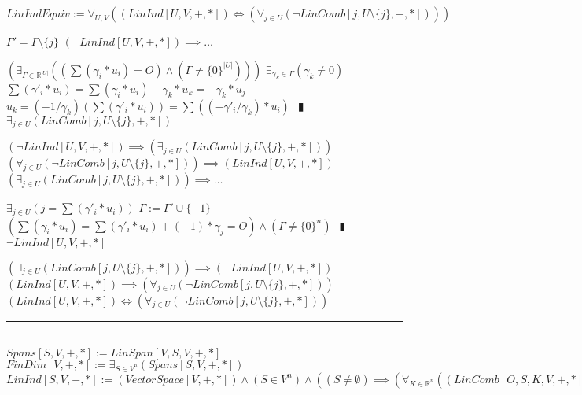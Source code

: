 \documentclass{book}
\newcommand{\abr}{:=}
\newcommand{\pipe}{$\phantom{(}\vrectangleblack\phantom{)}$}
\newcommand{\pr}[1]{\left(#1\right)}
\begin{document}
$LinIndEquiv \abr \forall_{U, V}\pr{(LinInd[U, V, +, *]) \iff \pr{\forall_{j \in U}(\lnot LinComb[j, U \setminus \{j\}, +, *])}}$
\begin{enumerate}
  \lit $\Gamma' = \Gamma \setminus \{j\}$
  \lit $(\lnot LinInd[U, V, +, *]) \implies \ldots$
  \begin{enumerate}
    \lit $\pr{\exists_{\Gamma \in \mathbb{R}^|U|}\pr{\pr{\sum(\gamma_i * u_i) = O} \land (\Gamma \neq \{0\}^{|U|})}}$
    \lit $\exists_{\gamma_k \in \Gamma}(\gamma_k \neq 0)$
    \lit $\sum(\gamma'_i * u_i) = \sum(\gamma_i * u_i) - \gamma_k * u_k = -\gamma_k * u_j$
    \lit $u_k = (-1 / \gamma_k)\pr{\sum(\gamma'_i * u_i)} = \sum\pr{ (-\gamma'_i / \gamma_k) * u_i}$ \pipe $\exists_{j \in U}(LinComb[j, U \setminus \{j\}, +, *])$
   \end{enumerate}
  \lit $(\lnot LinInd[U, V, +, *]) \implies \pr{\exists_{j \in U}(LinComb[j, U \setminus \{j\}, +, *])}$
  \lit $\pr{\forall_{j \in U}(\lnot LinComb[j, U \setminus \{j\}, +, *])} \implies (LinInd[U, V, +, *])$
  \lit $\pr{\exists_{j \in U}(LinComb[j, U \setminus \{j\}, +, *])} \implies \ldots$
  \begin{enumerate}
    \lit $\exists_{j \in U}\pr{j = \sum(\gamma'_i * u_i)}$
    \lit $\Gamma \abr \Gamma' \cup \{-1\}$
    \lit $\pr{\sum(\gamma_i * u_i) = \sum(\gamma'_i * u_i) + (-1) * \gamma_j = O} \land (\Gamma \neq \{0\}^n)$ \pipe $\lnot LinInd[U, V, +, *]$
  \end{enumerate}
  \lit $\pr{\exists_{j \in U}(LinComb[j, U \setminus \{j\}, +, *])} \implies (\lnot LinInd[U, V, +, *])$
  \lit $(LinInd[U, V, +, *]) \implies \pr{\forall_{j \in U}(\lnot LinComb[j, U \setminus \{j\}, +, *])}$
  \lit $(LinInd[U, V, +, *]) \iff \pr{\forall_{j \in U}(\lnot LinComb[j, U \setminus \{j\}, +, *])}$
\end{enumerate} \vspace{.75mm} \hrule \vspace{.75mm} \ \\ 

$Spans[S, V, +, *] \abr LinSpan[V, S, V, +, *]$ \\
$FinDim[V, +, *] \abr \exists_{S \in V^n}(Spans[S, V, +, *])$ \\
$LinInd[S, V, +, *] \abr (VectorSpace[V, +, *]) \land (S \in V^n) \land \pr{(S \neq \emptyset) \implies \pr{\forall_{K \in \mathbb{R}^n}\pr{(LinComb[O, S, K, V, +, *]) \implies (K = \{0\}^n)}}}$ \\
\end{document}

